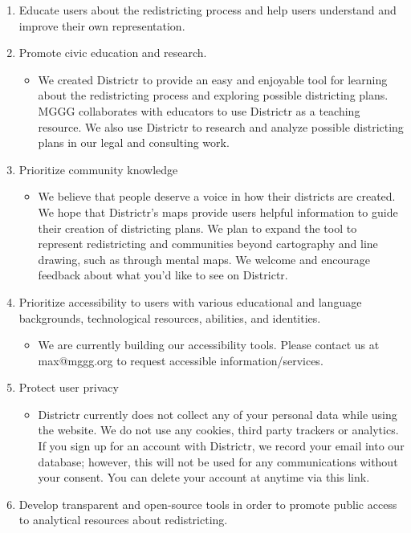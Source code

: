 \documentclass{mgggarticle}
\begin{document}
\begin{enumerate}
  \item Educate users about the redistricting process and help users understand and improve their own representation.
  \item Promote civic education and research. 
  \begin{itemize}
      \item We created Districtr to provide an easy and enjoyable tool for learning about the redistricting process and exploring possible districting plans. MGGG collaborates with educators to use Districtr as a teaching resource.  We also use Districtr to research and analyze possible districting plans in our legal and consulting work. 
  \end{itemize}
  \item Prioritize community knowledge

  

  \begin{itemize}
      \item We believe that people deserve a voice in how their districts are created. We hope that Districtr’s maps provide users helpful information to guide their creation of districting plans. We plan to expand the tool to represent redistricting and communities beyond cartography and line drawing, such as through mental maps. We welcome and encourage feedback about what you’d like to see on Districtr.

  \end{itemize}
  \item Prioritize accessibility to users with various educational and language backgrounds, technological resources, abilities, and identities. 
  \begin{itemize}
      \item We are currently building our accessibility tools. Please contact us at max@mggg.org to request accessible information/services.
  \end{itemize}
  \item Protect user privacy
  \begin{itemize}
      \item Districtr currently does not collect any of your personal data while using the website. We do not use any cookies, third party trackers or analytics. If you sign up for an account with Districtr, we record your email into our database; however, this will not be used for any communications without your consent. You can delete your account at anytime via this link.
  \end{itemize}
  \item Develop transparent and open-source tools in order to promote public access to analytical resources about redistricting. 

\end{enumerate}
\end{document}
